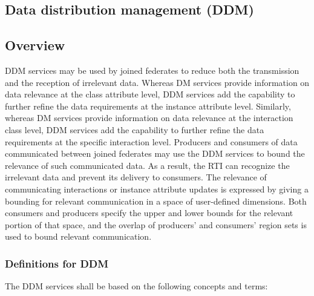 
\clearpage

\begin{compactstdpage}

    \section{Data distribution management (DDM)}

    \subsection{Overview}

    DDM services may be used by joined federates to reduce both the transmission and the reception of irrelevant data. Whereas DM services provide information on data relevance at the class attribute level, DDM services add the capability to further refine the data requirements at the instance attribute level. Similarly, whereas DM services provide information on data relevance at the interaction class level, DDM services add the capability to further refine the data requirements at the specific interaction level. Producers and consumers of data communicated between joined federates may use the DDM services to bound the relevance of such communicated data. As a result, the RTI can recognize the irrelevant data and prevent its delivery to consumers. The relevance of communicating interactions or instance attribute updates is expressed by giving a bounding for relevant communication in a space of user-defined dimensions. Both consumers and producers specify the upper and lower bounds for the relevant portion of that space, and the overlap of producers' and consumers' region sets is used to bound relevant communication.

    \subsubsection{Definitions for DDM}

    The DDM services shall be based on the following concepts and terms:


\end{compactstdpage}
